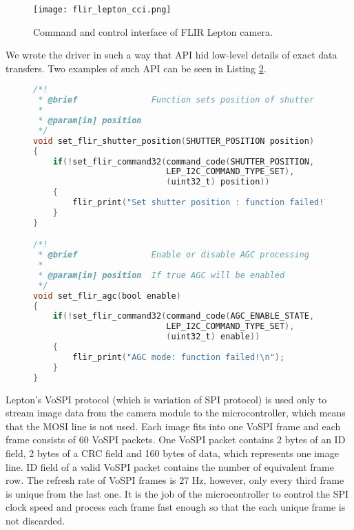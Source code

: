 \begin{figure}[ht]
        \centering
        \texttt{[image: flir\_lepton\_cci.png]} 
        \caption{ Command and control interface of FLIR Lepton camera.} 
        \label{flir_lepton_cci}
\end{figure}

We wrote the driver in such a way that API hid low-level details of exact data transfers. 
Two examples of such API can be seen in Listing \ref{flir_api}.

\lstset{style=mystyle}
\begin{figure}[ht]
\begin{lstlisting}[language=C]
/*!
 * @brief               Function sets position of shutter
 *
 * @param[in] position  
 */
void set_flir_shutter_position(SHUTTER_POSITION position)
{ 
    if(!set_flir_command32(command_code(SHUTTER_POSITION, 
                           LEP_I2C_COMMAND_TYPE_SET), 
                           (uint32_t) position))
    {
        flir_print("Set shutter position : function failed!\n");
    }
}

/*!
 * @brief               Enable or disable AGC processing
 *
 * @param[in] position  If true AGC will be enabled
 */
void set_flir_agc(bool enable)
{
    if(!set_flir_command32(command_code(AGC_ENABLE_STATE, 
                           LEP_I2C_COMMAND_TYPE_SET), 
                           (uint32_t) enable))
    {
        flir_print("AGC mode: function failed!\n");
    }
}
\end{lstlisting}
\label{flir_api}
\end{figure}

Lepton's VoSPI protocol (which is variation of SPI protocol) is used only to stream image data from the camera module to the microcontroller, which means that the MOSI line is not used.
Each image fits into one VoSPI frame and each frame consists of 60 VoSPI packets.
One VoSPI packet contains 2 bytes of an ID field, 2 bytes of a CRC field and 160 bytes of data\footnotemark, which represents one image line.
ID field of a valid VoSPI packet contains the number of equivalent frame row.
The refresh rate of VoSPI frames is 27 \si{\hertz}, however, only every third frame is unique from the last one.
It is the job of the microcontroller to control the SPI clock speed and process each frame fast enough so that the each unique frame is not discarded.


